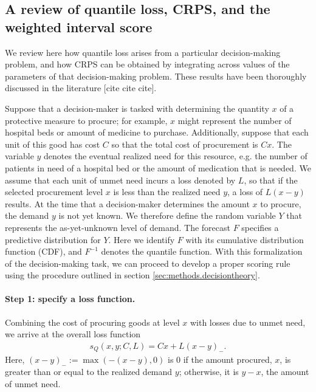 \documentclass{article}
\begin{document}

\subsection{A review of quantile loss, CRPS, and the weighted interval score}
\label{sec:methods.quantileloss}

We review here how quantile loss arises from a particular decision-making problem, and how CRPS can be obtained by integrating across values of the parameters of that decision-making problem. These results have been thoroughly discussed in the literature [cite cite cite].

Suppose that a decision-maker is tasked with determining the quantity $x$ of a protective measure to procure; for example, $x$ might represent the number of hospital beds or amount of medicine to purchase. Additionally, suppose that each unit of this good has cost $C$ so that the total cost of procurement is $Cx$. The variable $y$ denotes the eventual realized need for this resource, e.g. the number of patients in need of a hospital bed or the amount of medication that is needed. We assume that each unit of unmet need incurs a loss denoted by $L$, so that if the selected procurement level $x$ is less than the realized need $y$, a loss of $L(x-y)$ results. At the time that a decision-maker determines the amount $x$ to procure, the demand $y$ is not yet known. We therefore define the random variable $Y$ that represents the as-yet-unknown level of demand. The forecast $F$ specifies a predictive distribution for $Y$. Here we identify $F$ with its cumulative distribution function (CDF), and $F^{-1}$ denotes the quantile function. With this formalization of the decision-making task, we can proceed to develop a proper scoring rule using the procedure outlined in section \ref{sec:methods.decisiontheory}.

\paragraph{Step 1: specify a loss function.} Combining the cost of procuring goods at level $x$ with losses due to unmet need, we arrive at the overall loss function
\begin{align}
s_Q(x,y; C, L) = Cx + L(x-y)_-.
\end{align}
Here, $(x - y)_- := \max(-(x - y),0)$ is $0$ if the amount procured, $x$, is greater than or equal to the realized demand $y$; otherwise, it is $y - x$, the amount of unmet need.
\end{document}
